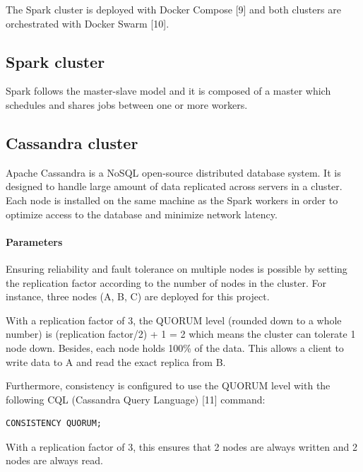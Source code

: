 \documentclass[11pt]{article}
\begin{document}

The \textsf{Spark} cluster is deployed with \textsf{Docker Compose} [9] and both clusters are orchestrated with \textsf{Docker Swarm} [10].

\subsection{Spark cluster}

\textsf{Spark} follows the master-slave model and it is composed of a master which schedules and shares jobs between one or more workers.

\subsection{Cassandra cluster}

\textsf{Apache Cassandra} is a \textsf{NoSQL} open-source distributed database system. It is designed to handle large amount of data replicated across servers in a cluster. Each node is installed on the same machine as the \textsf{Spark} workers in order to optimize access to the database and minimize network latency.

\paragraph{Parameters}

Ensuring reliability and fault tolerance on multiple nodes is possible by setting the replication factor according to the number of nodes in the cluster. For instance, three nodes (A, B, C) are deployed for this project. 

With a replication factor of 3, the QUORUM level (rounded down to a whole number) is (replication factor/2) + 1 = 2 which means the cluster can tolerate 1 node down. Besides, each node holds 100\% of the data. This allows a client to write data to A and read the exact replica from B.

Furthermore, consistency is configured to use the QUORUM level with the following \textsf{CQL} (\textsf{Cassandra} Query Language) [11] command:

\begin{lstlisting}[xleftmargin=5cm]
    CONSISTENCY QUORUM;
\end{lstlisting}
With a replication factor of 3, this ensures that 2 nodes are always written and 2 nodes are always read.
\end{document}
